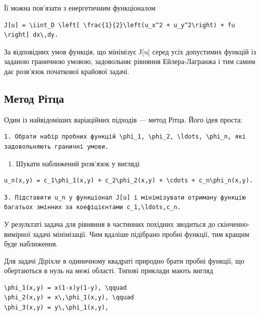 \documentclass[
  ukrainian,
]{article}
\providecommand{\tightlist}{%
  \setlength{\itemsep}{0pt}\setlength{\parskip}{0pt}}
\begin{document}
Її можна пов'язати з енергетичним функціоналом

\begin{verbatim}
J[u] = \iint_D \left[ \frac{1}{2}\left(u_x^2 + u_y^2\right) + fu \right] dx\,dy.
\end{verbatim}

За відповідних умов функція, що мінімізує J{[}u{]} серед усіх допустимих
функцій із заданою граничною умовою, задовольняє рівняння
Ейлера-Лагранжа і тим самим дає розв'язок початкової крайової задачі.

\subsection{Метод
Рітца}\label{ux43cux435ux442ux43eux434-ux440ux456ux442ux446ux430}

Один із найвідоміших варіаційних підходів --- метод Рітца. Його ідея
проста:

\begin{verbatim}
1. Обрати набір пробних функцій \phi_1, \phi_2, \ldots, \phi_n, які задовольняють граничні умови.
\end{verbatim}

\begin{enumerate}
\def\labelenumi{\arabic{enumi}.}
\setcounter{enumi}{1}
\tightlist
\item
  Шукати наближений розв'язок у вигляді
\end{enumerate}

\begin{verbatim}
u_n(x,y) = c_1\phi_1(x,y) + c_2\phi_2(x,y) + \cdots + c_n\phi_n(x,y).
\end{verbatim}

\begin{verbatim}
3. Підставити u_n у функціонал J[u] і мінімізувати отриману функцію багатьох змінних за коефіцієнтами c_1,\ldots,c_n.
\end{verbatim}

У результаті задача для рівняння в частинних похідних зводиться до
скінченно-вимірної задачі мінімізації. Чим вдаліше підібрано пробні
функції, тим кращим буде наближення.

Для задачі Діріхле в одиничному квадраті природно брати пробні функції,
що обертаються в нуль на межі області. Типові приклади мають вигляд

\begin{verbatim}
\phi_1(x,y) = x(1-x)y(1-y), \qquad
\phi_2(x,y) = x\,\phi_1(x,y), \qquad
\phi_3(x,y) = y\,\phi_1(x,y),
\end{verbatim}
\end{document}
